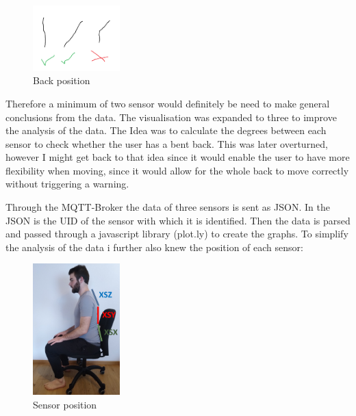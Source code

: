 \begin{figure}[ht]
  \begin{center}
\includegraphics[width=0.3\textwidth]{images/Backposition.png}
  \end{center}
  \caption{Back position}
  \label{fig:BackPos}
\end{figure}

Therefore a minimum of two sensor would definitely be need to make general conclusions from the data. The visualisation was expanded to three to improve the analysis of the data.  The Idea was to calculate the degrees between each sensor to check whether the user has a bent back. This was later overturned, however I might get back to that idea since it would enable the user to have more flexibility when moving, since it would allow for the whole back to move correctly without triggering a warning.

Through the MQTT-Broker the data of three sensors is sent as JSON. In the JSON is the UID of the sensor with which it is identified. Then the data is parsed and passed through a javascript library (plot.ly) \cite{ModernAn18:online} to create the graphs. To simplify the analysis of the data i further also knew the position of each sensor:

\begin{figure}[ht]
  \begin{center}
\includegraphics[width=0.3\textwidth]{images/ChairVisualised.png}
  \end{center}
  \caption{Sensor position}
  \label{fig:SensorPos}
\end{figure}

